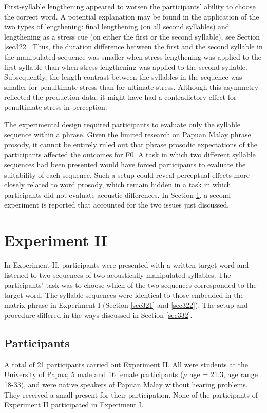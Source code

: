 First-syllable lengthening appeared to worsen the participants' ability to choose the correct word. A potential explanation may be found in the application of the two types of lengthening: final lengthening (on all second syllables) and lengthening as a stress cue (on either the first or the second syllable), see Section \ref{sec322}. Thus, the duration difference between the first and the second syllable in the manipulated sequence was smaller when stress lengthening was applied to the first syllable than when stress lengthening was applied to the second syllable. Subsequently, the length contrast between the syllables in the sequence was smaller for penultimate stress than for ultimate stress. Although this asymmetry reflected the production data, it might have had a contradictory effect for penultimate stress in perception.

The experimental design required participants to evaluate only the syllable sequence within a phrase. Given the limited research on Papuan Malay phrase prosody, it cannot be entirely ruled out that phrase prosodic expectations of the participants affected the outcomes for F0. A task in which two different syllable sequences had been presented would have forced participants to evaluate the suitability of each sequence. Such a setup could reveal perceptual effects more closely related to word prosody, which remain hidden in a task in which participants did not evaluate acoustic differences. In Section \ref{sec33}, a second experiment is reported that accounted for the two issues just discussed.

\section{Experiment II} \label{sec33}

In Experiment II, participants were presented with a written target word and listened to two sequences of two acoustically manipulated syllables. The participants' task was to choose which of the two sequences corresponded to the target word. The syllable sequences were identical to those embedded in the matrix phrase in Experiment I (Section \ref{sec321} and \ref{sec322}). The setup and procedure differed in the ways discussed in Section \ref{sec332}.

\subsection{Participants}
A total of 21 participants carried out Experiment II. All were students at the University of Papua; 5 male and 16 female participants ($\mu$ age = 21.3, age range 18-33), and were native speakers of Papuan Malay without hearing problems. They received a small present for their participation. None of the participants of Experiment II participated in Experiment I.

